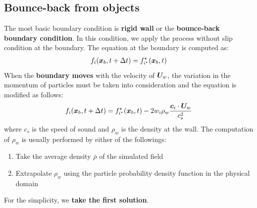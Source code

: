 \subsection{Bounce-back from objects}
The most basic boundary condition is 
{\bf rigid wall} or the {\bf bounce-back boundary condition}.
In this condition, we apply the process without
slip condition at the boundary.
The equation at the boundary is computed as\cite{succi2018lattice}:
\begin{equation}
\begin{aligned}
  f_i(\boldsymbol{x}_b, t + \Delta t) = f_{i^\star}^\star(\boldsymbol{x}_b, t)
\end{aligned}
\label{discretized-rigid-wall}
\end{equation}
When the {\bf boundary moves} with the velocity of
$\boldsymbol{U}_w$, the variation in the momentum of particles
must be taken into consideration and the equation is
modified as follows\cite{succi2018lattice}:
\begin{equation}
  \begin{aligned}
    f_i(\boldsymbol{x}_b, t + \Delta t) = f_{i^\star}^\star (\boldsymbol{x}_b, t) - 
    2 w_i \rho_w \frac{
      \boldsymbol{c}_i \cdot \boldsymbol{U}_w
    }{c_s^2}
  \end{aligned}
  \label{discretized-moving-wall}
\end{equation}
where $c_s$ is the speed of sound and 
$\rho_w$ is the density at the wall.
The computation of $\rho_w$ is usually performed by
either of the followings\cite{zou1997pressure, khajepor2019study}:
\begin{enumerate}
  \item Take the average density $\bar{\rho}$ of the simulated field
  \item Extrapolate $\rho_w$ using 
  the particle probability density function in the physical domain
\end{enumerate}
For the simplicity, we {\bf take the first solution}.

